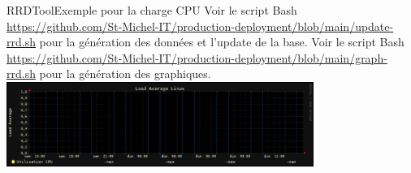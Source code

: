 \documentclass{beamer}
\begin{document}
    \begin{frame}{RRDTool}{Exemple pour la charge CPU}
        Voir le script Bash \url{https://github.com/St-Michel-IT/production-deployment/blob/main/update-rrd.sh} pour la génération des données et l'update de la base.
        \bigbreak
        Voir le script Bash \url{https://github.com/St-Michel-IT/production-deployment/blob/main/graph-rrd.sh} pour la génération des graphiques.
        \bigbreak
        \centering
        \includegraphics[width=10cm]{image/../../load.equinoxe-day}
    \end{frame}
\end{document}
